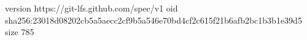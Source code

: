 version https://git-lfs.github.com/spec/v1
oid sha256:23018d08202cb5a5aecc2cf9b5a546e70bd4cf2c615f21b6afb2bc1b3b1e39d5
size 785
